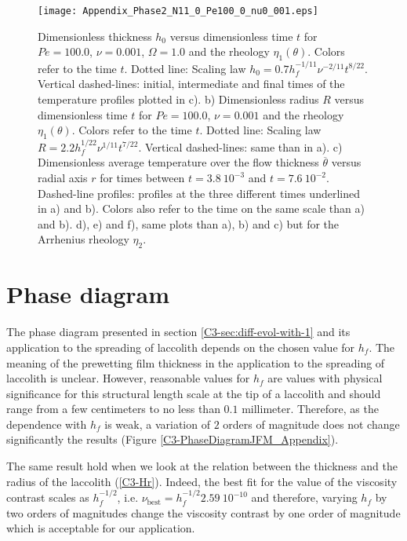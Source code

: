 \begin{figure}[h!]
  \begin{center}
    \graphicspath{ {/Users/thorey/Documents/These/Projet/Refroidissement/Skin_Model/Figure/Figure_Heating/} }
    \texttt{[image: Appendix\_Phase2\_N11\_0\_Pe100\_0\_nu0\_001.eps]}
    \caption{Dimensionless thickness  $h_0$ versus  dimensionless time
      $t$ for  $Pe=100.0$, $\nu=0.001$, $\Omega=1.0$ and  the rheology
      $\eta_1(\theta)$.  Colors  refer to the time  $t$.  Dotted line:
      Scaling  law $h_0=  0.7h_f^{-1/11}\nu^{-2/11}t^{8/22}$. Vertical
      dashed-lines:  initial,  intermediate  and final  times  of  the
      temperature profiles plotted in c).  b) Dimensionless radius $R$
      versus dimensionless  time $t$  for $Pe=100.0$,  $\nu=0.001$ and
      the rheology  $\eta_1(\theta)$.  Colors  refer to the  time $t$.
      Dotted line:  Scaling law  $R= 2.2h_f^{1/22}\nu^{1/11}t^{7/22}$.
      Vertical dashed-lines: same than in a). c) Dimensionless average
      temperature over  the flow thickness  $\overline{\theta}$ versus
      radial   axis  $r$   for  times   between  $t=3.8~10^{-3}$   and
      $t=7.6~10^{-2}$.   Dashed-line profiles:  profiles at  the three
      different times  underlined in a)  and b). Colors also  refer to
      the time on the same scale than  a) and b).  d), e) and f), same
      plots  than  a),  b)  and  c) but  for  the  Arrhenius  rheology
      $\eta_2$.}
    \label{C4-Appendix_Phase2_N11_0_Pe100_0_nu0_001}
  \end{center}
\end{figure}

\section{Phase diagram}

The phase  diagram presented in  section \ref{C3-sec:diff-evol-with-1}
and  its application  to the  spreading  of laccolith  depends on  the
chosen value for $h_f$.  The  meaning of the prewetting film thickness
in the application to the spreading of laccolith is unclear.  However,
reasonable values for $h_f$ are  values with physical significance for
this structural  length scale  at the  tip of  a laccolith  and should
range  from  a few  centimeters  to  no  less than  $0.1$  millimeter.
Therefore, as  the dependence with $h_f$  is weak, a variation  of $2$
orders of magnitude does not  change significantly the results (Figure
\ref{C3-PhaseDiagramJFM_Appendix}).

The  same  result hold  when  we  look  at  the relation  between  the
thickness and the  radius of the laccolith  (\ref{C3-Hr}). Indeed, the
best  fit  for   the  value  of  the  viscosity   contrast  scales  as
$h_f^{-1/2}$,  i.e.   $\nu_{\text{best}}=h_f^{-1/2}2.59~10^{-10}$  and
therefore,  varying  $h_f$ by  two  orders  of magnitudes  change  the
viscosity contrast by  one order of magnitude which  is acceptable for
our application.

